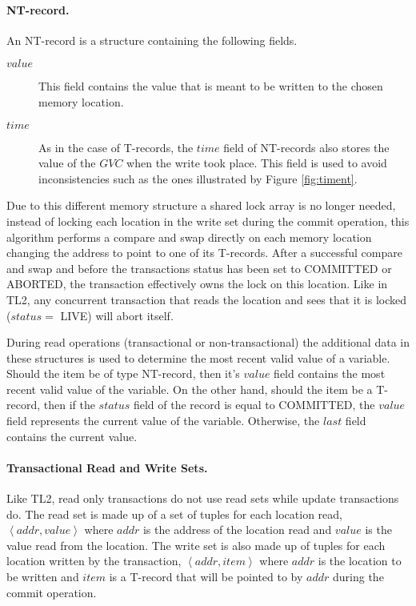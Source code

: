 \documentclass[runningheads,a4paper]{llncs}
\newcommand{\tuple}[1]{\ensuremath{\left \langle #1 \right \rangle }}
\begin{document}
\paragraph{NT-record.}
An NT-record is a structure containing the following fields.
\begin{description}
\item[$\mathit{value}$]
This field contains the value that is meant to be written to the chosen 
memory location.
\item[$\mathit{time}$]
As in the case of T-records, the $\mathit{time}$ field of NT-records 
also stores the value 
of the $\mathit{GVC}$ when the write took place. This field is 
used to avoid inconsistencies such as the ones illustrated by Figure 
\ref{fig:timent}. 
\end{description}

Due to this different memory structure a shared lock array is no longer needed,
instead of locking each location in the write set during the commit operation, this algorithm
performs a compare and swap directly on each memory location changing the address to point to one of its T-records.
After a successful compare and swap
 and before the transactions status has been set to COMMITTED or ABORTED, the transaction effectively
owns the lock on this location.
Like in TL2, any concurrent transaction that reads the location and sees that it is locked ($\mathit{status} = $ LIVE) will
abort itself.

During read operations (transactional or non-transactional) the additional data in these structures is used 
to determine the most  recent valid value  of a variable.
Should the item be of type NT-record,
then it's $\mathit{value}$ field contains the most  
recent valid value  of the variable. On the other hand,  should the item
 be a  T-record, then if the $\mathit{status}$ field of
the record is equal to COMMITTED,  
the $\mathit{value}$ field represents the current value of the variable. Otherwise, the
$\mathit{last}$ field contains the current value.

\paragraph{Transactional Read and Write Sets.}
Like TL2, read only transactions do not use read sets while update transactions do.
The read set is made up of a set of tuples for each location read, $\tuple{\mathit{addr, value}}$
where $\mathit{addr}$ is the address of the location read and $\mathit{value}$ is the value
read from the location.
The write set is also made up of tuples for each location written by the transaction,
$\tuple{\mathit{addr, item}}$ where $\mathit{addr}$ is the location to be written
and $\mathit{item}$ is a T-record that will be pointed to
by $\mathit{addr}$ during the commit operation.
\end{document}
